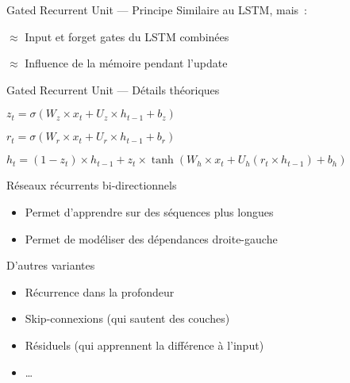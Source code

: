 \begin{frame}{Gated Recurrent Unit --- Principe}
  Similaire au LSTM, mais~:
  \begin{description}[<+->]
    \item[Update gate] $\approx$ Input et forget gates du LSTM combinées
    \item[Reset gate] $\approx$ Influence de la mémoire pendant l'update
  \end{description}
\end{frame}

\begin{frame}{Gated Recurrent Unit --- Détails théoriques}
  \begin{description}[<+->]
    \item[Update gate] $z_t = \sigma (W_z \times x_t + U_z \times h_{t - 1} + b_z)$
    \item[Reset gate] $r_t = \sigma (W_r \times x_t + U_r \times h_{t - 1} + b_r)$
    \item[Sortie] $h_t = (1 - z_t) \times h_{t - 1} + z_t \times \tanh(W_h \times x_t + U_h (r_t \times h_{t - 1}) + b_h)$
  \end{description}
\end{frame}

\begin{frame}{Réseaux récurrents bi-directionnels}
  \begin{itemize}[<+->]
    \item Permet d'apprendre sur des séquences plus longues
    \item Permet de modéliser des dépendances droite-gauche
  \end{itemize}
\end{frame}

\begin{frame}{D'autres variantes}
  \begin{itemize}[<+->]
    \item Récurrence dans la profondeur
    \item Skip-connexions (qui sautent des couches)
    \item Résiduels (qui apprennent la différence à l'input)
    \item …
  \end{itemize}
\end{frame}

